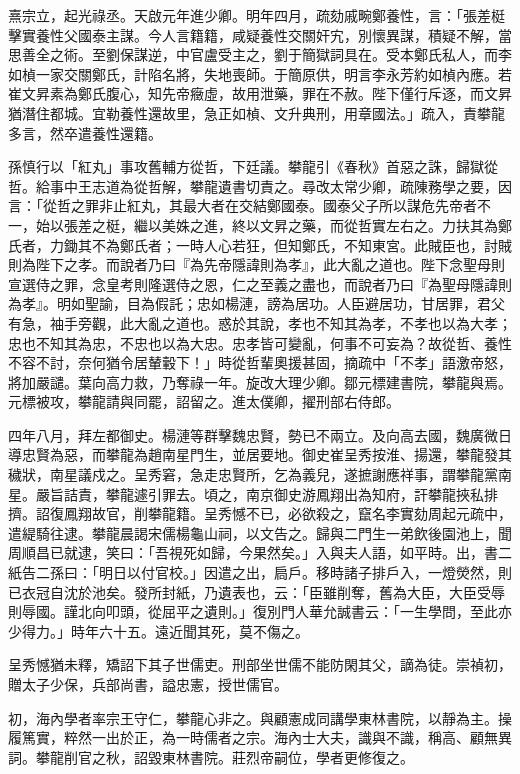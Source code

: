 \begin{pinyinscope}
熹宗立，起光祿丞。天啟元年進少卿。明年四月，疏劾戚畹鄭養性，言：「張差梃擊實養性父國泰主謀。今人言籍籍，咸疑養性交關奸宄，別懷異謀，積疑不解，當思善全之術。至劉保謀逆，中官盧受主之，劉于簡獄詞具在。受本鄭氏私人，而李如楨一家交關鄭氏，計陷名將，失地喪師。于簡原供，明言李永芳約如楨內應。若崔文昇素為鄭氏腹心，知先帝癥虛，故用泄藥，罪在不赦。陛下僅行斥逐，而文昇猶潛住都城。宜勒養性還故里，急正如楨、文升典刑，用章國法。」疏入，責攀龍多言，然卒遣養性還籍。

孫慎行以「紅丸」事攻舊輔方從哲，下廷議。攀龍引《春秋》首惡之誅，歸獄從哲。給事中王志道為從哲解，攀龍遺書切責之。尋改太常少卿，疏陳務學之要，因言：「從哲之罪非止紅丸，其最大者在交結鄭國泰。國泰父子所以謀危先帝者不一，始以張差之梃，繼以美姝之進，終以文昇之藥，而從哲實左右之。力扶其為鄭氏者，力鋤其不為鄭氏者；一時人心若狂，但知鄭氏，不知東宮。此賊臣也，討賊則為陛下之孝。而說者乃曰『為先帝隱諱則為孝』，此大亂之道也。陛下念聖母則宣選侍之罪，念皇考則隆選侍之恩，仁之至義之盡也，而說者乃曰『為聖母隱諱則為孝』。明如聖諭，目為假託；忠如楊漣，謗為居功。人臣避居功，甘居罪，君父有急，袖手旁觀，此大亂之道也。惑於其說，孝也不知其為孝，不孝也以為大孝；忠也不知其為忠，不忠也以為大忠。忠孝皆可變亂，何事不可妄為？故從哲、養性不容不討，奈何猶令居輦轂下！」時從哲輩奧援甚固，摘疏中「不孝」語激帝怒，將加嚴譴。葉向高力救，乃奪祿一年。旋改大理少卿。鄒元標建書院，攀龍與焉。元標被攻，攀龍請與同罷，詔留之。進太僕卿，擢刑部右侍郎。

四年八月，拜左都御史。楊漣等群擊魏忠賢，勢已不兩立。及向高去國，魏廣微日導忠賢為惡，而攀龍為趙南星門生，並居要地。御史崔呈秀按淮、揚還，攀龍發其穢狀，南星議戍之。呈秀窘，急走忠賢所，乞為義兒，遂摭謝應祥事，謂攀龍黨南星。嚴旨詰責，攀龍遽引罪去。頃之，南京御史游鳳翔出為知府，訐攀龍挾私排擠。詔復鳳翔故官，削攀龍籍。呈秀憾不已，必欲殺之，竄名李實劾周起元疏中，遣緹騎往逮。攀龍晨謁宋儒楊龜山祠，以文告之。歸與二門生一弟飲後園池上，聞周順昌已就逮，笑曰：「吾視死如歸，今果然矣。」入與夫人語，如平時。出，書二紙告二孫曰：「明日以付官校。」因遣之出，扃戶。移時諸子排戶入，一燈熒然，則已衣冠自沈於池矣。發所封紙，乃遺表也，云：「臣雖削奪，舊為大臣，大臣受辱則辱國。謹北向叩頭，從屈平之遺則。」復別門人華允誠書云：「一生學問，至此亦少得力。」時年六十五。遠近聞其死，莫不傷之。

呈秀憾猶未釋，矯詔下其子世儒吏。刑部坐世儒不能防閑其父，謫為徒。崇禎初，贈太子少保，兵部尚書，謚忠憲，授世儒官。

初，海內學者率宗王守仁，攀龍心非之。與顧憲成同講學東林書院，以靜為主。操履篤實，粹然一出於正，為一時儒者之宗。海內士大夫，識與不識，稱高、顧無異詞。攀龍削官之秋，詔毀東林書院。莊烈帝嗣位，學者更修復之。


\end{pinyinscope}
